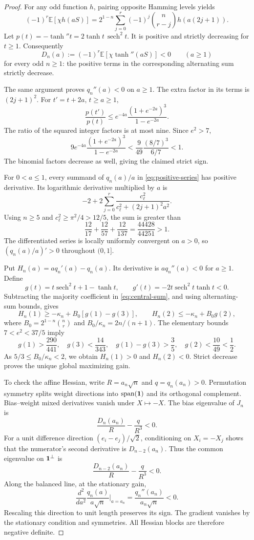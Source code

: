 \documentclass[11pt]{article}
\theoremstyle{remark}\newtheorem{remark}[theorem]{Remark}
\newcommand{\E}{\mathbb E}\newcommand{\R}{\mathbb R}
\newcommand{\sech}{\operatorname{sech}}
\begin{document}
\begin{proof}
For any odd function $h$, pairing opposite Hamming levels yields
\begin{equation}\label{eq:central-sum}
 (-1)^r\E[\chi h(aS)]
 =2^{1-n}\sum_{j=0}^r(-1)^j\binom n{r-j}h(a(2j+1)).
\end{equation}
Let $p(t)=-\tanh''t=2\tanh t\,\sech^2t$. It is positive and strictly
decreasing for $t\ge1$. Consequently
\begin{equation}\label{eq:Dnegative}
 D_n(a):=(-1)^r\E[\chi\tanh''(aS)]<0
 \qquad(a\ge1)
\end{equation}
for every odd $n\ge1$: the positive terms in the corresponding
alternating sum strictly decrease.

The same argument proves $q_n''(a)<0$ on $a\ge1$. The extra factor in
its terms is $(2j+1)^2$. For $t'=t+2a$, $t\ge a\ge1$,
\[
 \frac{p(t')}{p(t)}
 \le e^{-4a}\frac{(1+e^{-2a})^3}{1-e^{-2a}}.
\]
The ratio of the squared integer factors is at most nine. Since $e^2>7$,
\[
 9e^{-4a}\frac{(1+e^{-2a})^3}{1-e^{-2a}}
 <\frac9{49}\frac{(8/7)^3}{6/7}<1.
\]
The binomial factors decrease as well, giving the claimed strict sign.

For $0<a\le1$, every summand of $q_n(a)/a$ in
\eqref{eq:positive-series} has positive derivative. Its logarithmic
derivative multiplied by $a$ is
\[
 -2+2\sum_{j=0}^r
       \frac{c_\ell^2}{c_\ell^2+(2j+1)^2a^2}.
\]
Using $n\ge5$ and $c_\ell^2\ge\pi^2/4>12/5$, the sum is greater than
\[
 \frac{12}{17}+\frac{12}{57}+\frac{12}{137}
 =\frac{44428}{44251}>1.
\]
The differentiated series is locally uniformly convergent on $a>0$,
so $(q_n(a)/a)'>0$ throughout $(0,1]$.

Put $H_n(a)=a q_n'(a)-q_n(a)$. Its derivative is $a q_n''(a)<0$
for $a\ge1$. Define
\[
 g(t)=t\sech^2t+1-\tanh t,
 \qquad g'(t)=-2t\sech^2t\tanh t<0.
\]
Subtracting the majority coefficient in \eqref{eq:central-sum}, and
using alternating-sum bounds, gives
\[
 H_n(1)\ge-\kappa_n+B_0[g(1)-g(3)],\qquad
 H_n(2)\le-\kappa_n+B_0g(2),
\]
where $B_0=2^{1-n}\binom nr$ and $B_0/\kappa_n=2n/(n+1)$.
The elementary bounds $7<e^2<37/5$ imply
\[
 g(1)>\frac{290}{441},\quad g(3)<\frac{14}{343},\quad
 g(1)-g(3)>\frac35,\quad g(2)<\frac{10}{49}<\frac12.
\]
As $5/3\le B_0/\kappa_n<2$, we obtain $H_n(1)>0$ and $H_n(2)<0$.
Strict decrease proves the unique global maximizing gain.

To check the affine Hessian, write $R=a_n\sqrt n$ and $q=q_n(a_n)>0$.
Permutation symmetry splits weight directions into $\operatorname{span}(\mathbf 1)$
and its orthogonal complement. Bias--weight mixed derivatives vanish
under $X\mapsto-X$. The bias eigenvalue of $J_n$ is
\[
 \frac{D_n(a_n)}R-\frac q{R^3}<0.
\]
For a unit difference direction $(e_i-e_j)/\sqrt2$, conditioning on
$X_i=-X_j$ shows that the numerator's second derivative is
$D_{n-2}(a_n)$. Thus the common eigenvalue on $\mathbf 1^\perp$ is
\[
 \frac{D_{n-2}(a_n)}R-\frac q{R^3}<0.
\]
Along the balanced line, at the stationary gain,
\[
 \frac{d^2}{da^2}\frac{q_n(a)}{a\sqrt n}\bigg|_{a=a_n}
 =\frac{q_n''(a_n)}{a_n\sqrt n}<0.
\]
Rescaling this direction to unit length preserves its sign. The gradient
vanishes by the stationary condition and symmetries. All Hessian
blocks are therefore negative definite.
\end{proof}
\end{document}
